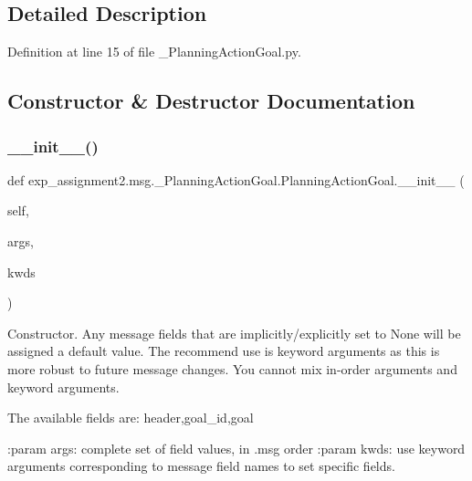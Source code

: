 \subsection{Detailed Description}


Definition at line 15 of file \+\_\+\+Planning\+Action\+Goal.\+py.



\subsection{Constructor \& Destructor Documentation}
\mbox{\label{classexp__assignment2_1_1msg_1_1__PlanningActionGoal_1_1PlanningActionGoal_ae4ad7c7a3f6900ed4bb956995492c571}} 
\subsubsection{\texorpdfstring{\+\_\+\+\_\+init\+\_\+\+\_\+()}{\_\_init\_\_()}}
{\footnotesize\ttfamily def exp\+\_\+assignment2.\+msg.\+\_\+\+Planning\+Action\+Goal.\+Planning\+Action\+Goal.\+\_\+\+\_\+init\+\_\+\+\_\+ (\begin{DoxyParamCaption}\item[{}]{self,  }\item[{}]{args,  }\item[{}]{kwds }\end{DoxyParamCaption})}

\begin{DoxyVerb}Constructor. Any message fields that are implicitly/explicitly
set to None will be assigned a default value. The recommend
use is keyword arguments as this is more robust to future message
changes.  You cannot mix in-order arguments and keyword arguments.

The available fields are:
   header,goal_id,goal

:param args: complete set of field values, in .msg order
:param kwds: use keyword arguments corresponding to message field names
to set specific fields.
\end{DoxyVerb}
 

